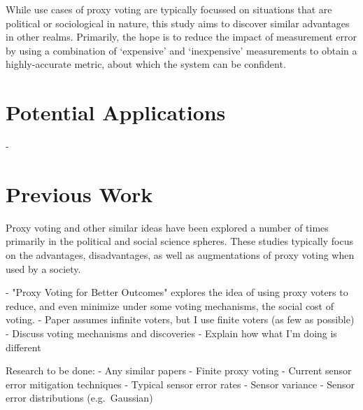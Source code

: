 While use cases of proxy voting are typically focussed on situations that
are political or sociological in nature, this study aims to discover similar
advantages in other realms.
Primarily, the hope is to reduce the impact of measurement error by using
a combination of `expensive' and `inexpensive' measurements to obtain a
highly-accurate metric, about which the system can be confident.


\section{Potential Applications}\label{sec:potential-applications}
- %

\section{Previous Work}\label{sec:previous-work}
Proxy voting and other similar ideas have been explored a number of times
primarily in the political and social science spheres\cite{Cohensius2017, Mueller1972, Zhang2022, Goelz2021}.
These studies typically focus on the advantages, disadvantages, as well as
augmentations of proxy voting when used by a society.

- "Proxy Voting for Better Outcomes"\cite{Cohensius2017} explores the idea of
  using proxy voters to reduce, and even minimize under some voting mechanisms,
  the social cost of voting.
    - Paper assumes infinite voters, but I use finite voters (as few as possible)
    - Discuss voting mechanisms and discoveries
    - Explain how what I'm doing is different

Research to be done:
- Any similar papers
- Finite proxy voting
- Current sensor error mitigation techniques
- Typical sensor error rates
- Sensor variance
- Sensor error distributions (e.g.\ Gaussian)


